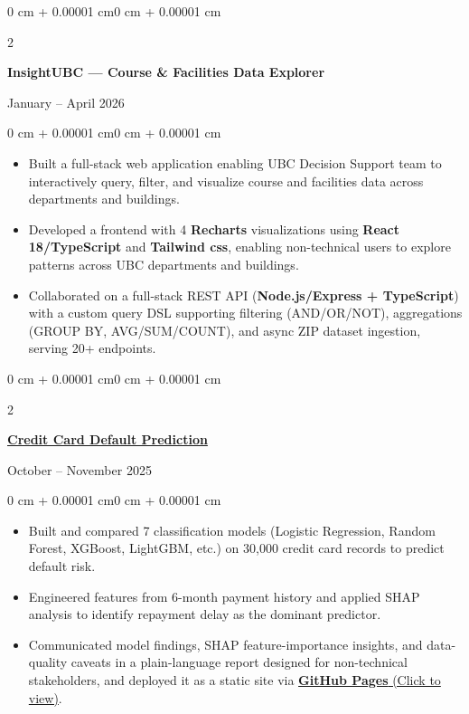 \documentclass[10pt, letterpaper]{article}
\newenvironment{highlights}{
    \begin{itemize}[
        topsep=0.10 cm,
        parsep=0.10 cm,
        partopsep=0pt,
        itemsep=0pt,
        leftmargin=0 cm + 10pt
    ]
}{
    \end{itemize}
}
\newenvironment{onecolentry}{
    \begin{adjustwidth}{0 cm + 0.00001 cm}{0 cm + 0.00001 cm}
}{
    \end{adjustwidth}
}
\newenvironment{twocolentry}[2][]{
    \onecolentry
    \def\secondColumn{#2}
    \setcolumnwidth{\fill, 4.5 cm}
    \begin{paracol}{2}
}{
    \switchcolumn \raggedleft \secondColumn
    \end{paracol}
    \endonecolentry
}
\begin{document}
    \vspace{0.2 cm}

    \begin{twocolentry}{January -- April 2026}
        \textbf{InsightUBC — Course \& Facilities Data Explorer}
    \end{twocolentry}
    \vspace{0.10 cm}
    \begin{onecolentry}
        \begin{highlights}
            \item Built a full-stack web application enabling UBC Decision Support team to interactively 
            query, filter, and visualize course and facilities data across departments and buildings.
            \item Developed a frontend with 4 \textbf{Recharts} visualizations using \textbf{React 18/TypeScript} and \textbf{Tailwind css},
            enabling non-technical users to explore patterns across UBC departments and buildings.
            \item Collaborated on a full-stack REST API (\textbf{Node.js/Express + TypeScript})
            with a custom query DSL supporting filtering (AND/OR/NOT), aggregations (GROUP BY, AVG/SUM/COUNT),
            and async ZIP dataset ingestion, serving 20+ endpoints.
        \end{highlights}
    \end{onecolentry}

    \vspace{0.2 cm}
    
    \begin{twocolentry}{October -- November 2025}
        \href{https://github.com/DavidHua04/CreditCardDefaultPost.github.io}{\textbf{Credit Card Default Prediction}}
    \end{twocolentry}

    \vspace{0.10 cm}
    \begin{onecolentry}
        \begin{highlights}
            \item Built and compared 7 classification models (Logistic Regression, Random Forest, XGBoost, LightGBM, etc.)
            on 30,000 credit card records to predict default risk.
            \item Engineered features from 6-month payment history and applied SHAP analysis to identify repayment delay as the dominant predictor.
            \item Communicated model findings, SHAP feature-importance insights, and data-quality caveats in a plain-language report
            designed for non-technical stakeholders, and deployed it as a static site via \href{https://davidhua04.github.io/CreditCardDefaultPost.github.io/}{\textbf{GitHub Pages} (Click to view)}.
        \end{highlights}
    \end{onecolentry}
\end{document}

